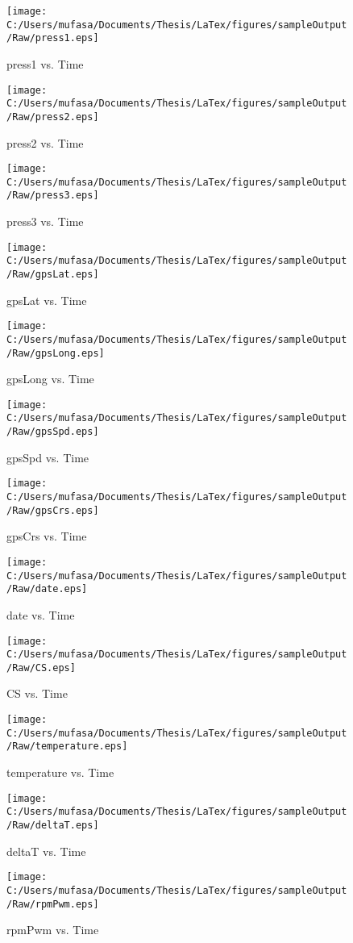 \begin{figure}[]
	\centering
	\caption{press1 vs. Time}
		\texttt{[image: C:/Users/mufasa/Documents/Thesis/LaTex/figures/sampleOutput/Raw/press1.eps]}
\end{figure}
\begin{figure}[]
	\centering
	\caption{press2 vs. Time}
		\texttt{[image: C:/Users/mufasa/Documents/Thesis/LaTex/figures/sampleOutput/Raw/press2.eps]}
\end{figure}
\begin{figure}[]
	\centering
	\caption{press3 vs. Time}
		\texttt{[image: C:/Users/mufasa/Documents/Thesis/LaTex/figures/sampleOutput/Raw/press3.eps]}
\end{figure}
\begin{figure}[]
	\centering
	\caption{gpsLat vs. Time}
		\texttt{[image: C:/Users/mufasa/Documents/Thesis/LaTex/figures/sampleOutput/Raw/gpsLat.eps]}
\end{figure}
\begin{figure}[]
	\centering
	\caption{gpsLong vs. Time}
		\texttt{[image: C:/Users/mufasa/Documents/Thesis/LaTex/figures/sampleOutput/Raw/gpsLong.eps]}
\end{figure}
\begin{figure}[]
	\centering
	\caption{gpsSpd vs. Time}
		\texttt{[image: C:/Users/mufasa/Documents/Thesis/LaTex/figures/sampleOutput/Raw/gpsSpd.eps]}
\end{figure}
\begin{figure}[]
	\centering
	\caption{gpsCrs vs. Time}
		\texttt{[image: C:/Users/mufasa/Documents/Thesis/LaTex/figures/sampleOutput/Raw/gpsCrs.eps]}
\end{figure}
\begin{figure}[]
	\centering
	\caption{date vs. Time}
		\texttt{[image: C:/Users/mufasa/Documents/Thesis/LaTex/figures/sampleOutput/Raw/date.eps]}
\end{figure}
\begin{figure}[]
	\centering
	\caption{CS vs. Time}
		\texttt{[image: C:/Users/mufasa/Documents/Thesis/LaTex/figures/sampleOutput/Raw/CS.eps]}
\end{figure}
\begin{figure}[]
	\centering
	\caption{temperature vs. Time}
		\texttt{[image: C:/Users/mufasa/Documents/Thesis/LaTex/figures/sampleOutput/Raw/temperature.eps]}
\end{figure}
\begin{figure}[]
	\centering
	\caption{deltaT vs. Time}
		\texttt{[image: C:/Users/mufasa/Documents/Thesis/LaTex/figures/sampleOutput/Raw/deltaT.eps]}
\end{figure}
\begin{figure}[]
	\centering
	\caption{rpmPwm vs. Time}
		\texttt{[image: C:/Users/mufasa/Documents/Thesis/LaTex/figures/sampleOutput/Raw/rpmPwm.eps]}
\end{figure}
